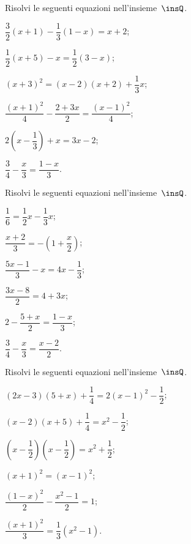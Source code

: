 \begin{esercizio}[\Ast]
\label{ese:15.31}
Risolvi le seguenti equazioni nell'insieme~$\insQ$.
\begin{multicols}{2}
\begin{enumeratea}
 \item $\dfrac{3}{2}(x+1)-\dfrac{1}{3}(1-x)=x+2$;
 \item $\dfrac{1}{2}(x+5)-x=\dfrac{1}{2}(3-x)$;
 \item $(x+3)^{2}=(x-2)(x+2)+\dfrac{1}{3}x$;
 \item $\dfrac{(x+1)^{2}}{4}-\dfrac{2+3x}{2}=\dfrac{(x-1)^{2}}{4}$;
 \item $2\left(x-\dfrac{1}{3}\right)+x=3x-2$;
 \item $\dfrac{3}{4}-\dfrac{x}{3}=\dfrac{1-x}{3}$.
\end{enumeratea}
\end{multicols}
\end{esercizio}

\begin{esercizio}[\Ast]
\label{ese:15.32}
Risolvi le seguenti equazioni nell'insieme~$\insQ$.
\begin{multicols}{2}
\begin{enumeratea}
 \item $\dfrac{1}{6}=\dfrac{1}{2}x-\dfrac{1}{3}x$;
 \item $\dfrac{x+2}{3}=-\left(1+\dfrac{x}{2}\right)$;
 \item $\dfrac{5x-1}{3}-x=4x-\dfrac{1}{3}$;
 \item $\dfrac{3x-8}{2}=4+3x$;
 \item $2-\dfrac{5+x}{2}=\dfrac{1-x}{3}$;
 \item $\dfrac{3}{4}-\dfrac{x}{3}=\dfrac{x-2}{2}$.
\end{enumeratea}
\end{multicols}
\end{esercizio}

\begin{esercizio}[\Ast]
\label{ese:15.33}
Risolvi le seguenti equazioni nell'insieme~$\insQ$.
\begin{multicols}{2}
\begin{enumeratea}
 \item $(2x-3)(5+x)+\dfrac{1}{4}=2(x-1)^{2}-\dfrac{1}{2}$;
 \item $(x-2)(x+5)+\dfrac{1}{4}=x^{2}-\dfrac{1}{2}$;
 \item $\left(x-\dfrac{1}{2}\right)\left(x-\dfrac{1}{2}\right)=x^{2}+\dfrac{1}{2}$;
 \item $(x+1)^{2}=(x-1)^{2}$;
 \item $\dfrac{(1-x)^{2}}{2}-\dfrac{x^{2}-1}{2}=1$;
 \item $\dfrac{(x+1)^{2}}{3}=\dfrac{1}{3}(x^{2}-1)$.
\end{enumeratea}
\end{multicols}
\end{esercizio}

